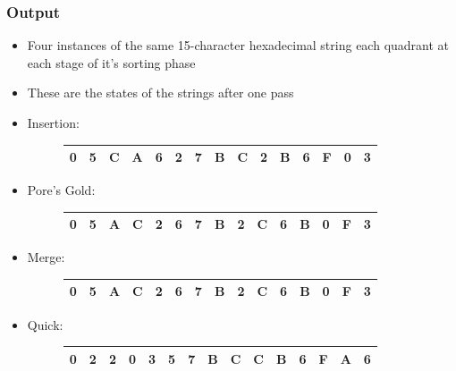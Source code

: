 \documentclass{beamer}
\begin{document}
\begin{frame}
\frametitle{Output}
\begin{itemize}

		\item Four instances of the same 15-character hexadecimal string each quadrant at each stage of it's sorting phase
		\item These are the states of the strings after one pass
		\item Insertion:
		\begin{figure}[!htpb]
		\begin{table}[]
		\begin{tabular}{|l|l|l|l|l|l|l|l|l|l|l|l|l|l|l|}
		\hline
		0 & 5 & C & A & 6 & 2 & 7 & B & C & 2 & B & 6 & F & 0 & 3 \\ \hline
		\end{tabular}
		\end{table}
		\end{figure}
		
		\item Pore's Gold:
		\begin{figure}[!htpb]
		\begin{table}[]
		\begin{tabular}{|l|l|l|l|l|l|l|l|l|l|l|l|l|l|l|}
		\hline
		0 & 5 & A & C & 2 & 6 & 7 & B & 2 & C & 6 & B & 0 & F & 3 \\ \hline
		\end{tabular}
		\end{table}
		\end{figure}
		
		\item Merge:
		\begin{figure}[!htpb]
		\begin{table}[]
		\begin{tabular}{|l|l|l|l|l|l|l|l|l|l|l|l|l|l|l|}
		\hline
		0 & 5 & A & C & 2 & 6 & 7 & B & 2 & C & 6 & B & 0 & F & 3 \\ \hline
		\end{tabular}
		\end{table}
		\end{figure}
		\item Quick:

		\begin{figure}[!htpb]
		\begin{table}[]
		\begin{tabular}{|l|l|l|l|l|l|l|l|l|l|l|l|l|l|l|}
		\hline
		0 & 2 & 2 & 0 & 3 & 5 & 7 & B & C & C & B & 6 & F & A & 6 \\ \hline
		\end{tabular}
		\end{table}
		\end{figure}
\end{itemize}
\end{frame}
\end{document}
